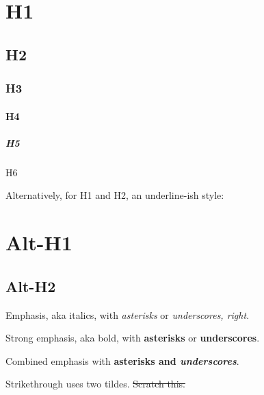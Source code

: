 \documentclass[
]{article}
\author{}
\date{}
\begin{document}
\section{H1}\label{h1}

\subsection{H2}\label{h2}

\subsubsection{H3}\label{h3}

\paragraph{H4}\label{h4}

\subparagraph{H5}\label{h5}

H6

Alternatively, for H1 and H2, an underline-ish style:

\section{Alt-H1}\label{alt-h1}

\subsection{Alt-H2}\label{alt-h2}

Emphasis, aka italics, with \emph{asterisks} or \emph{underscores,
right}.

Strong emphasis, aka bold, with \textbf{asterisks} or
\textbf{underscores}.

Combined emphasis with \textbf{asterisks and \emph{underscores}}.

Strikethrough uses two tildes. \st{Scratch this.}
\end{document}
